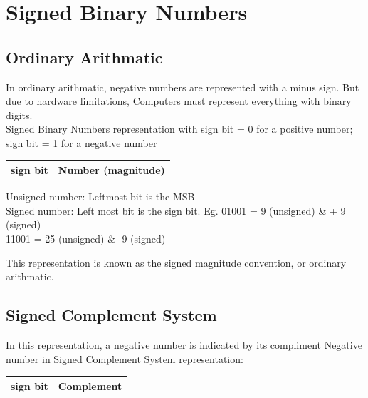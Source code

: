 \section{Signed Binary Numbers} 
\subsection{Ordinary Arithmatic}
In ordinary arithmatic, negative numbers are represented with a minus sign. But due to hardware limitations, Computers must represent everything with binary digits.\\ 
Signed Binary Numbers representation with sign bit = 0 for a positive number; sign bit = 1 for a negative number\\
\begin{table}[H]
\centering
\begin{tabular}{ll}
\hline
\multicolumn{1}{|l|}{\textbf{sign bit}} & \multicolumn{1}{l|}{\textbf{Number (magnitude)}} \\ \hline
\end{tabular}
\end{table}

Unsigned number: Leftmost bit is the MSB\\
Signed number: Left most bit is the sign bit.
Eg. 01001 = 9 (unsigned) \& + 9 (signed)\\
11001 = 25 (unsigned) \&  -9 (signed)

\par This representation is known as the signed magnitude convention, or ordinary arithmatic. 

\subsection{Signed Complement System}
In this representation, a negative number is indicated by its compliment Negative number in Signed Complement System representation:\\
\begin{table}[H]
\centering
\begin{tabular}{ll}
\hline
\multicolumn{1}{|l|}{\textbf{sign bit}} & \multicolumn{1}{l|}{\textbf{Complement}} \\ \hline
\end{tabular}
\end{table}

